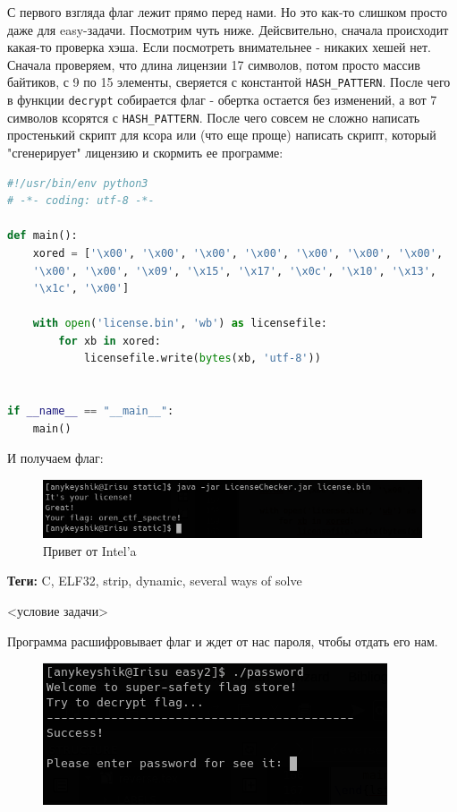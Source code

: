 \documentclass[idxtotoc,hyperref,openany,oneside]{files/reverse} %
\begin{document}
С первого взгляда флаг лежит прямо перед нами. Но это как-то слишком просто даже для easy-задачи. Посмотрим чуть ниже. Дейсвительно, сначала происходит какая-то проверка хэша. Если посмотреть внимательнее - никаких хешей нет. Сначала проверяем, что длина лицензии 17 символов, потом просто массив байтиков, с 9 по 15 элементы, сверяется с константой \verb|HASH_PATTERN|. После чего в функции \verb|decrypt| собирается флаг - обертка остается без изменений, а вот 7 символов ксорятся с \verb|HASH_PATTERN|. После чего совсем не сложно написать простенький скрипт для ксора или (что еще проще) написать скрипт, который "сгенерирует" лицензию и скормить ее программе:
\begin{lstlisting}[language=Python, caption=Генератор лицензии]
#!/usr/bin/env python3
# -*- coding: utf-8 -*-

def main():
    xored = ['\x00', '\x00', '\x00', '\x00', '\x00', '\x00', '\x00',
    '\x00', '\x00', '\x09', '\x15', '\x17', '\x0c', '\x10', '\x13', 
    '\x1c', '\x00']

    with open('license.bin', 'wb') as licensefile:
        for xb in xored:
            licensefile.write(bytes(xb, 'utf-8'))


if __name__ == "__main__":
    main()
\end{lstlisting}

И получаем флаг:
\begin{figure}[H]
\begin{center}
\includegraphics[width=0.7\linewidth]{files/java-flag}
\end{center}
\caption{Привет от Intel'a}
\label{fig:java-flag}
\end{figure}



\textbf{Теги:} C, ELF32, strip, dynamic, several ways of solve\vspace{\baselineskip}

\begin{tcolorbox}
<условие задачи>
\end{tcolorbox}

Программа расшифровывает флаг и ждет от нас пароля, чтобы отдать его нам.
\begin{figure}[H]
\begin{center}
\includegraphics[width=0.5\linewidth]{files/enigma-hello}
\end{center}
\label{fig:enigma-hello}
\end{figure}
\end{document}

